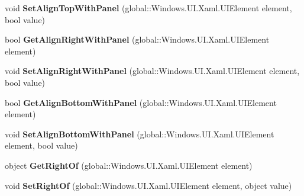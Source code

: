 \begin{DoxyCompactItemize}
void {\bfseries Set\+Align\+Top\+With\+Panel} (global\+::\+Windows.\+U\+I.\+Xaml.\+U\+I\+Element element, bool value)
\item 
\mbox{\label{interface_windows_1_1_u_i_1_1_xaml_1_1_controls_1_1_i_relative_panel_statics_a61fabd1c8713c07b5ac48fa9a27f4ae5}} 
bool {\bfseries Get\+Align\+Right\+With\+Panel} (global\+::\+Windows.\+U\+I.\+Xaml.\+U\+I\+Element element)
\item 
\mbox{\label{interface_windows_1_1_u_i_1_1_xaml_1_1_controls_1_1_i_relative_panel_statics_a2c4edfaf4e3bacc3f959ee0a58907e8a}} 
void {\bfseries Set\+Align\+Right\+With\+Panel} (global\+::\+Windows.\+U\+I.\+Xaml.\+U\+I\+Element element, bool value)
\item 
\mbox{\label{interface_windows_1_1_u_i_1_1_xaml_1_1_controls_1_1_i_relative_panel_statics_ae0d4717061b42365289442969aba8977}} 
bool {\bfseries Get\+Align\+Bottom\+With\+Panel} (global\+::\+Windows.\+U\+I.\+Xaml.\+U\+I\+Element element)
\item 
\mbox{\label{interface_windows_1_1_u_i_1_1_xaml_1_1_controls_1_1_i_relative_panel_statics_a0282f7f3fedefd9e7725ff429dfb714b}} 
void {\bfseries Set\+Align\+Bottom\+With\+Panel} (global\+::\+Windows.\+U\+I.\+Xaml.\+U\+I\+Element element, bool value)
\item 
\mbox{\label{interface_windows_1_1_u_i_1_1_xaml_1_1_controls_1_1_i_relative_panel_statics_a9439a2bee522a760bbb857e11546ccbc}} 
object {\bfseries Get\+Right\+Of} (global\+::\+Windows.\+U\+I.\+Xaml.\+U\+I\+Element element)
\item 
\mbox{\label{interface_windows_1_1_u_i_1_1_xaml_1_1_controls_1_1_i_relative_panel_statics_a15d40b2bf729423b60fb36c9ccf5cbb3}} 
void {\bfseries Set\+Right\+Of} (global\+::\+Windows.\+U\+I.\+Xaml.\+U\+I\+Element element, object value)
\item 

\end{DoxyCompactItemize}
